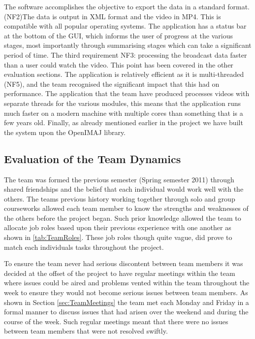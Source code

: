 The software accomplishes the objective to export the data in a standard format. (NF2)The data is output in XML format and the video in MP4. This is compatible with all popular operating systems. The application has a status bar at the bottom of the GUI, which informs the user of progress at the various stages, most importantly through summarising stages which can take a significant period of time. 
The third requirement NF3: processing the broadcast data faster than a user could watch the video. This point has been covered in the other evaluation sections. The application is relatively efficient as it is multi-threaded (NF5), and the team recognised the significant impact that this had on performance. The application that the team have produced processes videos with separate threads for the various modules, this means that the application runs much faster on a modern machine with multiple cores than something that is a few years old. Finally, as already mentioned earlier in the project we have built the system upon the OpenIMAJ library. 

\newpage
\subsection{Evaluation of the Team Dynamics}
\label{sec:EvaluationTeam}

The team was formed the previous semester (Spring semester 2011) through shared
friendships and the belief that each individual would work well with the
others. The teams previous history working together through solo and group
courseworks allowed each team member to know the strengths and weaknesses of the
others before the project began. Such prior knowledge allowed the team to
allocate job roles based upon their previous experience with one another as
shown in \ref{tab:TeamRoles}. These job roles though quite vague, did prove to
match each individuals tasks throughout the project.

To ensure the team never had serious discontent between team members
it was decided at the offset of the project to have regular meetings within the team
where issues could be aired and problems vented within the team throughout the
week to ensure they would not become serious issues between team members. As
shown in Section \ref{sec:TeamMeetings} the team met each Monday and Friday in a
formal manner to discuss issues that had arisen over the weekend and during the
course of the week. Such regular meetings meant that there were no issues
between team members that were not resolved swiftly.

